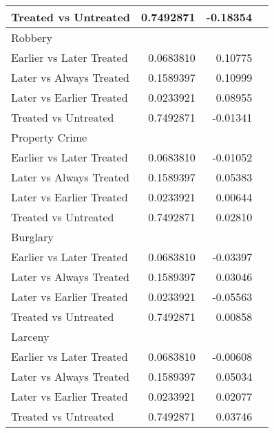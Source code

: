 \documentclass{article}
\begin{document}
\begin{table}[H]
\begin{tabular}[t]{lrrl}
\hspace{3mm}Treated vs Untreated & 0.7492871 & -0.18354\\
\midrule
Robbery\\
\hspace{3mm}Earlier vs Later Treated & 0.0683810 & 0.10775\\
\hspace{3mm}Later vs Always Treated & 0.1589397 & 0.10999\\
\hspace{3mm}Later vs Earlier Treated & 0.0233921 & 0.08955\\
\hspace{3mm}Treated vs Untreated & 0.7492871 & -0.01341\\
\midrule
Property Crime\\
\hspace{3mm}Earlier vs Later Treated & 0.0683810 & -0.01052\\
\hspace{3mm}Later vs Always Treated & 0.1589397 & 0.05383\\
\hspace{3mm}Later vs Earlier Treated & 0.0233921 & 0.00644\\
\hspace{3mm}Treated vs Untreated & 0.7492871 & 0.02810\\
\midrule
Burglary\\
\hspace{3mm}Earlier vs Later Treated & 0.0683810 & -0.03397\\
\hspace{3mm}Later vs Always Treated & 0.1589397 & 0.03046\\
\hspace{3mm}Later vs Earlier Treated & 0.0233921 & -0.05563\\
\hspace{3mm}Treated vs Untreated & 0.7492871 & 0.00858\\
\midrule
Larceny\\
\hspace{3mm}Earlier vs Later Treated & 0.0683810 & -0.00608\\
\hspace{3mm}Later vs Always Treated & 0.1589397 & 0.05034 \\
\hspace{3mm}Later vs Earlier Treated & 0.0233921 & 0.02077\\
\hspace{3mm}Treated vs Untreated & 0.7492871 & 0.03746\\

\end{tabular}
\end{table}
\end{document}
